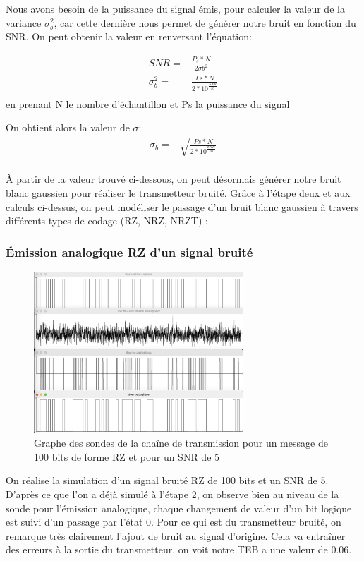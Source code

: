  Nous avons besoin de la puissance du signal émis, pour calculer la valeur de la variance $\sigma_b^2$, car cette dernière nous permet de générer notre bruit en fonction du SNR. On peut obtenir la valeur en renversant l'équation:

\begin{align*}
   SNR =& \frac{P_s * N}{2\sigma b^2}\\
   \sigma_b^2 =& \frac{Ps*N}{2*10^{\frac{SNR}{10}}}\\
\end{align*}
en prenant N le nombre d'échantillon et Ps la puissance du signal

On obtient alors la valeur de $\sigma$:
\begin{align*}
 \sigma_b =& \sqrt{\frac{Ps*N}{2*10^{\frac{SNR}{10}}}}\\
\end{align*}

À partir de la valeur trouvé ci-dessous, on peut désormais générer notre bruit blanc gaussien pour réaliser le transmetteur bruité. Grâce à l'étape deux et aux calculs ci-dessus, on peut modéliser le passage d'un bruit blanc gaussien à travers différents types de codage (RZ, NRZ, NRZT) :

\subsubsection{Émission analogique RZ d'un signal bruité}
\begin{figure}[H]
    \centering
    \includegraphics[width=0.7\textwidth]{img/etape3_emission_RZ_bruite.png}
    \caption{Graphe des sondes de la chaîne de transmission pour un message de 100 bits de forme RZ et pour un SNR de 5 }
    \label{fig:etape_3_RZ_bruite}
\end{figure}

On réalise la simulation d'un signal bruité RZ de 100 bits et un SNR de 5. D'après ce que l'on a déjà simulé à l'étape 2, on observe bien au niveau de la sonde pour l'émission analogique, chaque changement de valeur d'un bit logique est suivi d'un passage par l'état 0. Pour ce qui est du transmetteur bruité, on remarque très clairement l'ajout de bruit au signal d'origine. Cela va entraîner des erreurs à la sortie du transmetteur, on voit notre TEB a une valeur de 0.06.

